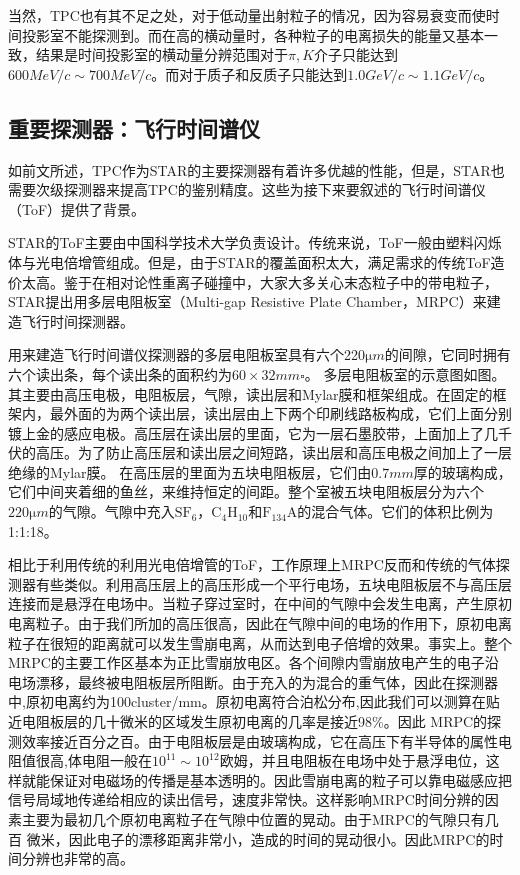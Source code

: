 \documentclass[%
 reprint,
 amsmath,amssymb,
 aps,
]{revtex4-1}
\begin{document}
当然，TPC也有其不足之处，对于低动量出射粒子的情况，因为容易衰变而使时间投影室不能探测到。而在高的横动量时，各种粒子的电离损失的能量又基本一致，结果是时间投影室的横动量分辨范围对于$\pi,K$介子只能达到 $600\si{MeV\per c}\sim700\si{MeV\per c}$。而对于质子和反质子只能达到$1.0\si{GeV\per c}\sim1.1\si{GeV\per c}$。
\subsection{\label{sec:ToF}重要探测器：飞行时间谱仪}
如前文所述，TPC作为STAR的主要探测器有着许多优越的性能，但是，STAR也需要次级探测器来提高TPC的鉴别精度。这些为接下来要叙述的飞行时间谱仪（ToF）提供了背景。

STAR的ToF主要由中国科学技术大学负责设计。传统来说，ToF一般由塑料闪烁体与光电倍增管组成。但是，由于STAR的覆盖面积太大，满足需求的传统ToF造价太高。鉴于在相对论性重离子碰撞中，大家大多关心末态粒子中的带电粒子，STAR提出用多层电阻板室（Multi-gap Resistive Plate Chamber，MRPC）来建造飞行时间探测器。

用来建造飞行时间谱仪探测器的多层电阻板室具有六个220$\si{\micro m}$的间隙，它同时拥有六个读出条，每个读出条的面积约为$60\times32\si{mm\square}$。 多层电阻板室的示意图如图。其主要由高压电极，电阻板层，气隙，读出层和Mylar膜和框架组成。在固定的框架内，最外面的为两个读出层，读出层由上下两个印刷线路板构成，它们上面分别镀上金的感应电极。高压层在读出层的里面，它为一层石墨胶带，上面加上了几千伏的高压。为了防止高压层和读出层之间短路，读出层和高压电极之间加上了一层绝缘的Mylar膜。 在高压层的里面为五块电阻板层，它们由$0.7\si{mm}$厚的玻璃构成，它们中间夹着细的鱼丝，来维持恒定的间距。整个室被五块电阻板层分为六个$220\si{\micro m}$的气隙。气隙中充入$\text{SF}_6$，$\text{C}_4\text{H}_{10}$和$\text{F}_{134}\text{A}$的混合气体。它们的体积比例为1:1:18。

相比于利用传统的利用光电倍增管的ToF，工作原理上MRPC反而和传统的气体探测器有些类似。利用高压层上的高压形成一个平行电场，五块电阻板层不与高压层连接而是悬浮在电场中。当粒子穿过室时，在中间的气隙中会发生电离，产生原初电离粒子。由于我们所加的高压很高，因此在气隙中间的电场的作用下，原初电离粒子在很短的距离就可以发生雪崩电离，从而达到电子倍增的效果。事实上。整个MRPC的主要工作区基本为正比雪崩放电区。各个间隙内雪崩放电产生的电子沿电场漂移，最终被电阻板层所阻断。由于充入的为混合的重气体，因此在探测器中,原初电离约为100cluster/mm。原初电离符合泊松分布,因此我们可以测算在贴近电阻板层的几十微米的区域发生原初电离的几率是接近98\%。因此 MRPC的探测效率接近百分之百。由于电阻板层是由玻璃构成，它在高压下有半导体的属性电阻值很高,体电阻一般在$10^{11}\sim10^{12}$欧姆，并且电阻板在电场中处于悬浮电位，这样就能保证对电磁场的传播是基本透明的。因此雪崩电离的粒子可以靠电磁感应把信号局域地传递给相应的读出信号，速度非常快。这样影响MRPC时间分辨的因素主要为最初几个原初电离粒子在气隙中位置的晃动。由于MRPC的气隙只有几百 微米，因此电子的漂移距离非常小，造成的时间的晃动很小。因此MRPC的时间分辨也非常的高。
\end{document}
